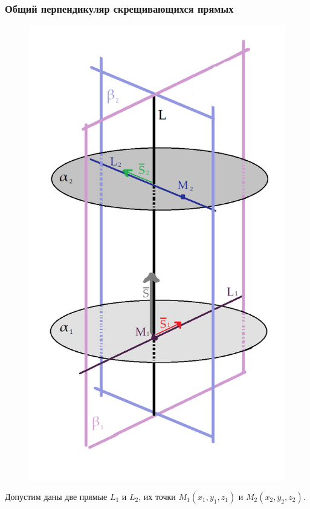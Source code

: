\documentclass{article}
\begin{document}
\subsubsection{Общий перпендикуляр скрещивающихся прямых}
\begin{figure}
    \centering
    \includegraphics[scale=0.4]{pic12.png}
\end{figure}
Допустим даны две прямые $L_1$ и $L_2$, их точки $M_1(x_1,y_1,z_1)$ и $M_2(x_2,y_2,z_2)$.
\end{document}
